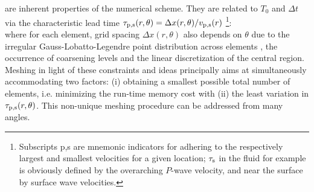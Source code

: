 are inherent properties of the numerical scheme.
They are related to $T_0$ and $\Delta t$ via the
characteristic lead time $\tau_{\rm p,s}(r,\theta)=\Delta x(r,\theta)/v_{\rm p,s}(r)$
\footnote{Subscripts p,s are mnemonic indicators for adhering to the respectively
largest and smallest velocities for a given location; $\tau_{\rm s}$ in the fluid for example
is obviously defined by the overarching $P$-wave velocity, and near the surface by surface
wave velocities.}:
%
\eqa
{} \label{eq:period}\\
\label{eq:timestep}
\ena
%
where for each element, grid spacing $\Delta x(r,\theta)$ also depends on $\theta$ due to the
irregular Gauss-Lobatto-Legendre point distribution across elements \citep{nissen+:07b},
the occurrence of coarsening levels and the linear discretization of the central region.
Meshing in light of these constraints and ideas
principally aims at simultaneously
accommodating two factors:
(i) obtaining a smallest possible total number of elements, i.e. minimizing
the run-time memory cost with
(ii) the least variation in $\tau_{\rm p,s}(r,\theta)$.
This non-unique meshing procedure can be addressed from many angles.
%
